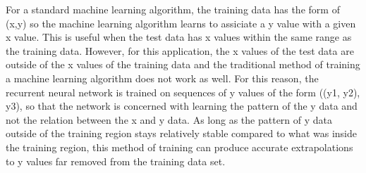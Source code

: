 \documentclass[%
oneside,                 %
final,                   %
10pt]{article}
\begin{document}
For a standard machine learning algorithm, the training data has the
form of (x,y) so the machine learning algorithm learns to assiciate a
y value with a given x value.  This is useful when the test data has x
values within the same range as the training data.  However, for this
application, the x values of the test data are outside of the x values
of the training data and the traditional method of training a machine
learning algorithm does not work as well.  For this reason, the
recurrent neural network is trained on sequences of y values of the
form ((y1, y2), y3), so that the network is concerned with learning
the pattern of the y data and not the relation between the x and y
data.  As long as the pattern of y data outside of the training region
stays relatively stable compared to what was inside the training
region, this method of training can produce accurate extrapolations to
y values far removed from the training data set.
\end{document}
